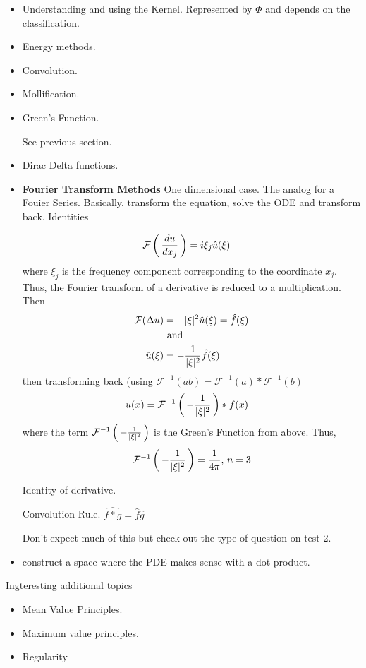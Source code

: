 \documentclass[12pt,a4paper]{report}
\begin{document}
{\begin{description}
\begin{itemize}
		\item Understanding and using the Kernel. Represented by $\Phi$ and depends on the classification.
		\item Energy methods.
		\item Convolution.
		\item Mollification.
		\item Green's Function.
		
		See previous section.
		
		\item Dirac Delta functions.
		\item \textbf{Fourier Transform Methods}  One dimensional case.  The analog for a Fouier Series.  Basically, transform the equation, solve the ODE and transform back.  Identities
	
	\begin{align*}
		\mathcal{F}\left (\, \frac{du}{dx_j} \,\right ) &= i\xi_j\hat{u}(\xi)
	\end{align*}where $\xi_j$ is the frequency component corresponding to the coordinate $x_j$.  Thus, the Fourier transform of a derivative is reduced to a multiplication.  Then
	\begin{align*}
		\mathcal{F}(\Delta u) &= -|\xi|^2\hat{u}(\xi)  =  \hat{f}(\xi)\\
		&\text{ and } \\
		\hat{u}(\xi) &= -\frac{1}{|\xi|^2}\hat{f}(\xi)
	\end{align*} then transforming back (using $\mathcal{F}^{-1}(ab)=\mathcal{F}^{-1}(a)*\mathcal{F}^{-1}(b)$
	\begin{align*}
		u(x) &= \mathcal{F}^{-1}\left (\, -\frac{1}{|\xi|^2} \,\right )* f(x)
	\end{align*}where the term $\mathcal{F}^{-1}\left (\, -\frac{1}{|\xi|^2} \,\right )$ is the Green's Function from above.  Thus,  $$\mathcal{F}^{-1}\left (\, -\frac{1}{|\xi|^2} \,\right )=\frac{1}{4\pi},\, n=3$$
	
	Identity of derivative.
	
	Convolution Rule. $\widehat{f*g} = \hat{f}\hat{g}$
	
	Don't expect much of this but check out the type of question on test 2.

		\item construct a space where the PDE makes sense with a dot-product.
	\end{itemize}		
	
	Ingteresting additional topics
	\begin{itemize}
		\item Mean Value Principles.
		\item Maximum value principles.
		\item Regularity
	\end{itemize}
	

\end{description}}
\end{document}
